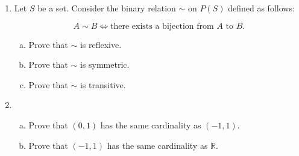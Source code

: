 \documentclass[12pt]{amsart}
\begin{document}
\begin{enumerate}[{\bfseries 1.}]
\newpage
\item Let $S$ be a set.  Consider the binary relation $\sim$ on $P(S)$ defined as follows:

	$$A\sim B\Longleftrightarrow\text{there exists a bijection from }A\text{ to }B.$$

	\begin{enumerate}[(a)]
	\vspace{0.2in}
	\item Prove that $\sim$ is reflexive.
		\vfill
	
	\vspace{0.1in}
	\item Prove that $\sim$ is symmetric.
		\vfill

	\vspace{0.1in}
	\item Prove that $\sim$ is transitive.
		\vfill

	\end{enumerate}

\newpage
\item\begin{enumerate}[(a)]
	\item Prove that $(0,1)$ has the same cardinality as $(-1,1)$.

	\newpage
	\item Prove that $(-1,1)$ has the same cardinality as $\mathbb{R}$.

	\end{enumerate}
\end{enumerate}
\end{document}
